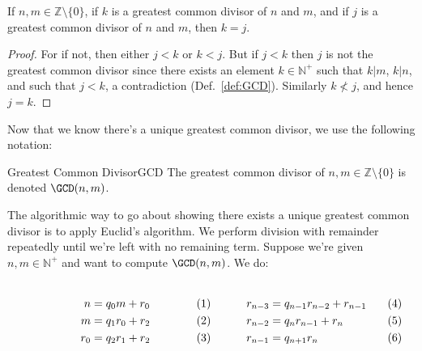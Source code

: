     \begin{theorem}
        \label{thm:GCD_Unique}%
        If $n,m\in\mathbb{Z}\setminus\{0\}$, if $k$ is a greatest common
        divisor of $n$ and $m$, and if $j$ is a greatest common
        divisor of $n$ and $m$, then $k=j$.
    \end{theorem}
    \begin{proof}
        For if not, then either $j<k$ or $k<j$. But if $j<k$ then $j$ is
        not the greatest common divisor since there exists an element
        $k\in\mathbb{N}^{+}$ such that $k|m$, $k|n$, and such that
        $j<k$, a contradiction (Def.~\ref{def:GCD}). Similarly
        $k\not<j$, and hence $j=k$.
    \end{proof}
    Now that we know there's a unique greatest common divisor, we
    use the following notation:
    \begin{fnotation}{Greatest Common Divisor}{GCD}
        The greatest common divisor of $n,m\in\mathbb{Z}\setminus\{0\}$
        is denoted $\GCD(n,m)$.
    \end{fnotation}
    The algorithmic way to go about showing there exists a unique
    greatest common divisor is to apply Euclid's algorithm. We perform
    division with remainder repeatedly until we're left with no
    remaining term. Suppose we're given $n,m\in\mathbb{N}^{+}$ and want
    to compute $\GCD(n,m)$. We do:
    \par
    \begin{subequations}
        \begin{minipage}[b]{0.49\textwidth}
            \centering
            \begin{align}
                n&=q_{0}m+r_{0}\\
                m&=q_{1}r_{0}+r_{2}\\
                r_{0}&=q_{2}r_{1}+r_{2}
            \end{align}
        \end{minipage}
        \hfill
        \begin{minipage}[b]{0.49\textwidth}
            \centering
            \begin{align}
                r_{n-3}&=q_{n-1}r_{n-2}+r_{n-1}\\
                r_{n-2}&=q_{n}r_{n-1}+r_{n}\\
                r_{n-1}&=q_{n+1}r_{n}
            \end{align}
        \end{minipage}
    \end{subequations}
